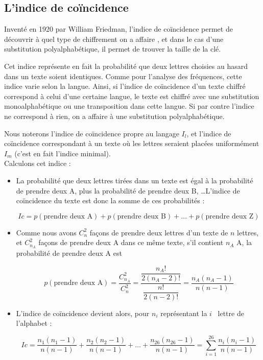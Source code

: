 \subsection{L'indice de coïncidence}
Inventé en 1920 par William Friedman, l'indice de coïncidence
permet de découvrir à quel type de chiffrement on a affaire 
, et dans le cas d'une
substitution polyalphabétique, il permet de trouver la taille de
la clé.

Cet indice représente en fait la probabilité que deux lettres
choisies au hasard dans un texte soient identiques. Comme pour
l'analyse des fréquences, cette indice varie selon la langue.
Ainsi, si l'indice de coïncidence d'un texte chiffré correspond à
celui d'une certaine langue, le texte est chiffré avec une
substitution monoalphabétique ou une transposition dans cette 
langue. Si par contre l'indice ne correspond à rien, on a affaire 
à une substitution polyalphabétique.

Nous noterons l'indice de coïncidence propre au langage $I_l$, et
l'indice de coïncidence correspondant à un texte où les lettres
seraient placées uniformément $I_m$ (c'est en fait l'indice
minimal). 
\\

Calculons cet indice :
\begin{itemize}
  \item La probabilité que deux lettres tirées dans un texte est
égal à la probabilité de prendre deux A, plus la probabilité de
prendre deux B, \dots L'indice de coïncidence du texte est donc la
somme de ces probabilités :
  \begin{center}
    \[ Ic = p(\mbox{prendre deux A}) + p(\mbox{prendre deux B}) +
\dots + p(\mbox{prendre deux Z}) \]
  \end{center}
  \item Comme nous avons $C_{n}^2$ façons de prendre deux lettres
d'un texte de $n$ lettres, et $C_{n_A}^2$ façons de prendre deux A
dans ce même texte, s'il contient $n_A$ A, la probabilité de prendre 
deux A est
  \begin{center}
    \[ p(\mbox{prendre deux A}) = \dfrac{C_{n_A}^2}{C_{n}^2} =
\dfrac{\dfrac{n_A!}{2 (n_A - 2)!}}{\dfrac{n!}{2 (n - 2)!}} = 
\dfrac{n_A (n_A - 1)}{n (n - 1)} \]
  \end{center}
  \item L'indice de coïncidence devient alors, pour $n_i$
représentant la $i$\ieme~ lettre de l'alphabet :
  \begin{center}
    \[ Ic = \frac{n_1 (n_1 - 1)}{n (n - 1)} + \frac{n_2 (n_2 - 1)}{n
(n - 1)} + \dots + \frac{n_{26} (n_{26} - 1)}{n (n - 1)} = \sum_{i
= 1}^{26} \frac{n_i (n_i - 1)}{n (n - 1)} \] 
  \end{center}
\end{itemize}

